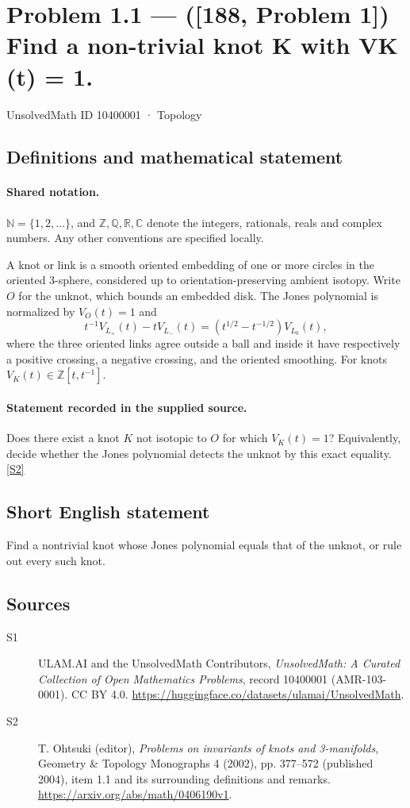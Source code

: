 \documentclass[11pt]{article}
\newcommand{\sref}[2]{\hyperlink{source:#1:#2}{[S#2]}}
\begin{document}
\setcounter{section}{10400000}
\section{Problem 1.1 — ([188, Problem 1]) Find a non-trivial knot K with VK (t) = 1.}\label{10400001}
{\small\sffamily UnsolvedMath ID 10400001 · Topology}
\subsection{Definitions and mathematical statement}

\paragraph{Shared notation.}$\mathbb N=\{1,2,\ldots\}$, and $\mathbb Z,\mathbb Q,\mathbb R,\mathbb C$ denote the integers, rationals, reals and complex numbers. Any other conventions are specified locally.


A knot or link is a smooth oriented embedding of one or more circles in the oriented $3$-sphere, considered up to orientation-preserving ambient isotopy. Write $O$ for the unknot, which bounds an embedded disk. The Jones polynomial is normalized by $V_O(t)=1$ and
\[t^{-1}V_{L_+}(t)-tV_{L_-}(t)=(t^{1/2}-t^{-1/2})V_{L_0}(t),\]
where the three oriented links agree outside a ball and inside it have respectively a positive crossing, a negative crossing, and the oriented smoothing. For knots $V_K(t)\in\mathbb Z[t,t^{-1}]$.
\paragraph{Statement recorded in the supplied source.}
Does there exist a knot $K$ not isotopic to $O$ for which $V_K(t)=1$? Equivalently, decide whether the Jones polynomial detects the unknot by this exact equality. \sref{10400001}{2}
\subsection{Short English statement}
Find a nontrivial knot whose Jones polynomial equals that of the unknot, or rule out every such knot.
\subsection{Sources}
\begin{description}
\item[\hypertarget{source:10400001:1}{S1}] ULAM.AI and the UnsolvedMath Contributors, \emph{UnsolvedMath: A Curated Collection of Open Mathematics Problems}, record 10400001 (AMR-103-0001). CC BY 4.0. \url{https://huggingface.co/datasets/ulamai/UnsolvedMath}.
\item[\hypertarget{source:10400001:2}{S2}] T. Ohtsuki (editor), \emph{Problems on invariants of knots and 3-manifolds}, Geometry \& Topology Monographs 4 (2002), pp. 377--572 (published 2004), item 1.1 and its surrounding definitions and remarks. \url{https://arxiv.org/abs/math/0406190v1}.
\end{description}
\label{end:10400001}
\end{document}
